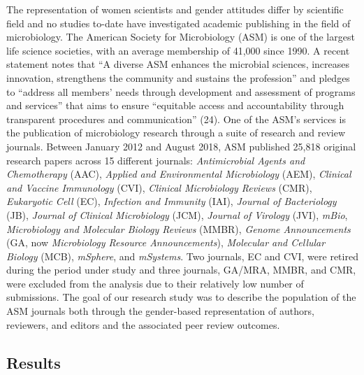 \documentclass[11pt,]{article}
\begin{document}
The representation of women scientists and gender attitudes differ by
scientific field and no studies to-date have investigated academic
publishing in the field of microbiology. The American Society for
Microbiology (ASM) is one of the largest life science societies, with an
average membership of 41,000 since 1990. A recent statement notes that
``A diverse ASM enhances the microbial sciences, increases innovation,
strengthens the community and sustains the profession'' and pledges to
``address all members' needs through development and assessment of
programs and services'' that aims to ensure ``equitable access and
accountability through transparent procedures and communication'' (24).
One of the ASM's services is the publication of microbiology research
through a suite of research and review journals. Between January 2012
and August 2018, ASM published 25,818 original research papers across 15
different journals: \emph{Antimicrobial Agents and Chemotherapy} (AAC),
\emph{Applied and Environmental Microbiology} (AEM), \emph{Clinical and
Vaccine Immunology} (CVI), \emph{Clinical Microbiology Reviews} (CMR),
\emph{Eukaryotic Cell} (EC), \emph{Infection and Immunity} (IAI),
\emph{Journal of Bacteriology} (JB), \emph{Journal of Clinical
Microbiology} (JCM), \emph{Journal of Virology} (JVI), \emph{mBio},
\emph{Microbiology and Molecular Biology Reviews} (MMBR), \emph{Genome
Announcements} (GA, now \emph{Microbiology Resource Announcements}),
\emph{Molecular and Cellular Biology} (MCB), \emph{mSphere}, and
\emph{mSystems}. Two journals, EC and CVI, were retired during the
period under study and three journals, GA/MRA, MMBR, and CMR, were
excluded from the analysis due to their relatively low number of
submissions. The goal of our research study was to describe the
population of the ASM journals both through the gender-based
representation of authors, reviewers, and editors and the associated
peer review outcomes.

\hypertarget{results}{%
\subsection{Results}\label{results}}
\end{document}

